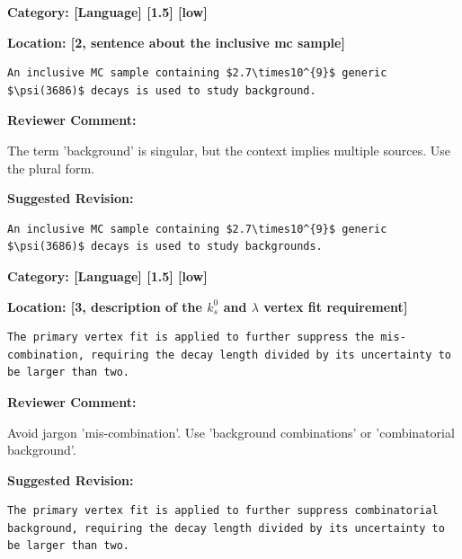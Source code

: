 \documentclass[12pt]{article}
\begin{document}
\begin{reviewer}
\noindent \textbf{Category: [Language] [1.5] [low]}

\noindent \textbf{Location: [2, sentence about the inclusive mc sample]}

\begin{lstlisting}[breaklines=true]
	An inclusive MC sample containing $2.7\times10^{9}$ generic $\psi(3686)$ decays is used to study background.
\end{lstlisting}

\textbf{Reviewer Comment:}

The term 'background' is singular, but the context implies multiple sources. Use the plural form.

\textbf{Suggested Revision:}

\begin{lstlisting}[breaklines=true]
	An inclusive MC sample containing $2.7\times10^{9}$ generic $\psi(3686)$ decays is used to study backgrounds.
\end{lstlisting}

\end{reviewer}

\begin{reviewer}
\noindent \textbf{Category: [Language] [1.5] [low]}

\noindent \textbf{Location: [3, description of the $k_s^0$ and $\lambda$ vertex fit requirement]}

\begin{lstlisting}[breaklines=true]
	The primary vertex fit is applied to further suppress the mis-combination, requiring the decay length divided by its uncertainty to be larger than two.
\end{lstlisting}

\textbf{Reviewer Comment:}

Avoid jargon 'mis-combination'. Use 'background combinations' or 'combinatorial background'.

\textbf{Suggested Revision:}

\begin{lstlisting}[breaklines=true]
	The primary vertex fit is applied to further suppress combinatorial background, requiring the decay length divided by its uncertainty to be larger than two.
\end{lstlisting}

\end{reviewer}
\end{document}
